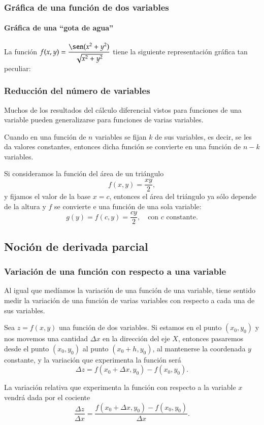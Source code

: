 \begin{frame}
\frametitle{Gráfica de una función de dos variables}
\framesubtitle{Gráfica de una ``gota de agua''}
La función $\displaystyle f(x,y)=\frac{\sen(x^2+y^2)}{\sqrt{x^2+y^2}}$ tiene la siguiente representación gráfica tan
peculiar:
\begin{center}
\scalebox{1}{}
\end{center}
\end{frame}


\begin{frame}
\frametitle{Reducción del número de variables}
Muchos de los resultados del cálculo diferencial vistos para funciones de una variable pueden generalizarse para funciones de varias variables.

Cuando en una función de $n$ variables se fijan $k$ de sus variables, es decir, se les da valores constantes, entonces dicha función se convierte en una función de $n-k$ variables.
 
 Si consideramos la función del área de un triángulo 
\[f(x,y)=\frac{xy}{2},\]
y fijamos el valor de la base $x=c$, entonces el área del triángulo ya sólo depende de la altura y $f$ se convierte e una función de una sola variable:
\[
g(y)=f(c,y)=\frac{cy}{2},\quad \mbox{con $c$ constante}.
\]
\end{frame}



\subsection{Noción de derivada parcial}
\begin{frame}
\frametitle{Variación de una función con respecto a una variable}
Al igual que medíamos la variación de una función de una variable, tiene sentido medir la variación de una función de varias variables con respecto a cada una de sus variables.

Sea $z=f (x,y)$ una función de dos variables. Si estamos en el punto $(x_0,y_0)$ y nos movemos una cantidad $\Delta x$ en la dirección del eje $X$, entonces pasaremos desde el punto $(x_0,y_0)$ al punto $(x_0+h,y_0)$, al mantenerse la coordenada $y$ constante, y la variación que experimenta la función será  
\[\Delta z=f(x_0+\Delta x,y_0)-f (x_0,y_0).\]

La variación relativa que experimenta la función con respecto a la variable $x$ vendrá dada por el cociente 
\[\frac{\Delta z}{\Delta x}=\frac{f(x_0+\Delta x,y_0)-f(x_0,y_0)}{\Delta x}.\]
\end{frame}


